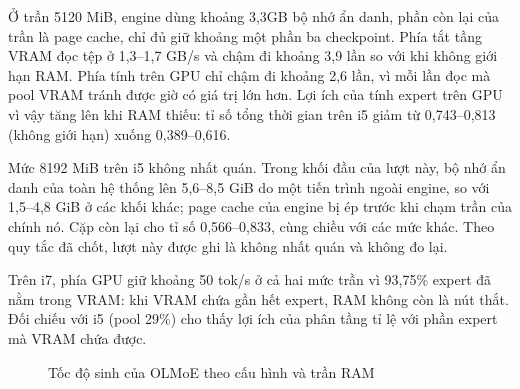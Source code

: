 Ở trần 5120 MiB, engine dùng khoảng 3,3GB bộ nhớ ẩn danh, phần còn lại của trần là page cache, chỉ đủ giữ khoảng một phần ba checkpoint. Phía tắt tầng VRAM đọc tệp ở 1,3--1,7 GB/s và chậm đi khoảng 3,9 lần so với khi không giới hạn RAM. Phía tính trên GPU chỉ chậm đi khoảng 2,6 lần, vì mỗi lần đọc mà pool VRAM tránh được giờ có giá trị lớn hơn. Lợi ích của tính expert trên GPU vì vậy tăng lên khi RAM thiếu: tỉ số tổng thời gian trên i5 giảm từ 0,743--0,813 (không giới hạn) xuống 0,389--0,616.

Mức 8192 MiB trên i5 không nhất quán. Trong khối đầu của lượt này, bộ nhớ ẩn danh của toàn hệ thống lên 5,6--8,5 GiB do một tiến trình ngoài engine, so với 1,5--4,8 GiB ở các khối khác; page cache của engine bị ép trước khi chạm trần của chính nó. Cặp còn lại cho tỉ số 0,566--0,833, cùng chiều với các mức khác. Theo quy tắc đã chốt, lượt này được ghi là không nhất quán và không đo lại.

Trên i7, phía GPU giữ khoảng 50 tok/s ở cả hai mức trần vì 93,75\% expert đã nằm trong VRAM: khi VRAM chứa gần hết expert, RAM không còn là nút thắt. Đối chiếu với i5 (pool 29\%) cho thấy lợi ích của phân tầng tỉ lệ với phần expert mà VRAM chứa được.

\begin{figure}[htbp]
\centering
{}
\caption{Tốc độ sinh của OLMoE theo cấu hình và trần RAM}
\label{fig:decode_bars}
\par{}
\end{figure}

